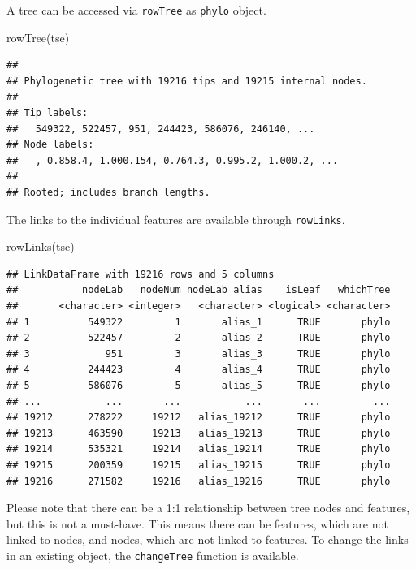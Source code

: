 \documentclass[
]{book}
\newenvironment{Shaded}{\begin{snugshade}}{\end{snugshade}}
\newcommand{\FunctionTok}[1]{\textcolor[rgb]{0.00,0.00,0.00}{#1}}
\newcommand{\NormalTok}[1]{#1}
\begin{document}
A tree can be accessed via \texttt{rowTree} as \texttt{phylo} object.

\begin{Shaded}
\begin{Highlighting}[]
\FunctionTok{rowTree}\NormalTok{(tse)}
\end{Highlighting}
\end{Shaded}

\begin{verbatim}
## 
## Phylogenetic tree with 19216 tips and 19215 internal nodes.
## 
## Tip labels:
##   549322, 522457, 951, 244423, 586076, 246140, ...
## Node labels:
##   , 0.858.4, 1.000.154, 0.764.3, 0.995.2, 1.000.2, ...
## 
## Rooted; includes branch lengths.
\end{verbatim}

The links to the individual features are available through \texttt{rowLinks}.

\begin{Shaded}
\begin{Highlighting}[]
\FunctionTok{rowLinks}\NormalTok{(tse)}
\end{Highlighting}
\end{Shaded}

\begin{verbatim}
## LinkDataFrame with 19216 rows and 5 columns
##           nodeLab   nodeNum nodeLab_alias    isLeaf   whichTree
##       <character> <integer>   <character> <logical> <character>
## 1          549322         1       alias_1      TRUE       phylo
## 2          522457         2       alias_2      TRUE       phylo
## 3             951         3       alias_3      TRUE       phylo
## 4          244423         4       alias_4      TRUE       phylo
## 5          586076         5       alias_5      TRUE       phylo
## ...           ...       ...           ...       ...         ...
## 19212      278222     19212   alias_19212      TRUE       phylo
## 19213      463590     19213   alias_19213      TRUE       phylo
## 19214      535321     19214   alias_19214      TRUE       phylo
## 19215      200359     19215   alias_19215      TRUE       phylo
## 19216      271582     19216   alias_19216      TRUE       phylo
\end{verbatim}

Please note that there can be a 1:1 relationship between tree nodes and
features, but this is not a must-have. This means there can be features, which
are not linked to nodes, and nodes, which are not linked to features. To change
the links in an existing object, the \texttt{changeTree} function is available.
\end{document}
